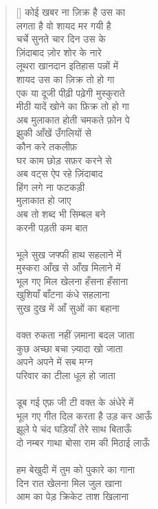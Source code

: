 \begin{verse}[\versewidth]\texthindi{
कोई खबर ना ज़िक्र है उस का\\
लगता है वो शायद मर गयी है\\
चर्चे सुनते चार दिन उस के\\
ज़िंदाबाद ज़ोर शोर के नारे\\
लूथरा खानदान इतिहास पन्नों में\\
शायद उस का ज़िक्र तो हो गा\\
एक या दूजी पीढ़ी पढ़ेगी मुस्कुराते\\
मीठी यादें खोने का फ़िक्र तो हो गा\\
अब मुलाकात होती चमकते फ़ोन पे\\
झुकी आँखें उँगलियों से\\
कौन करे तकलीफ़\\
घर काम छोड़ सफ़र करने से\\
अब वट्स ऐप रहे ज़िंदाबाद\\
हिंग लगे ना फटकड़ी\\
मुलाकात हो जाए\\
अब तो शब्द भी सिम्बल बने \\
करनी पड़ती कम बात \\
\\
भूले सुख जफ्फी हाथ सहलाने में\\
मुस्करा आँख से आँख मिलाने में\\
भूल गए मिल खेलना हँसना हँसाना\\
खुशियाँ बाँटना कंधे सहलाना\\
सुख दुख में आँ सुओं का बहाना\\
 \\
वक्त रुकता नहीं ज़माना बदल जाता \\
कुछ अच्छा बचा ज़्यादा खो जाता\\
अपने अपने में सब मग्न\\
परिवार का टीला धूल हो जाता\\
\\
डूब गई एफ़ जी टी वक्त के अंधेरे में\\
भूल गए गीत दिल करता है उड़ कर आऊँ\\
झूले पे चंद घड़ियाँ तेरे साथ बिताऊँ\\
दो नम्बर गाथा बोसा राम की मिठाई लाऊँ\\
\\
हम बेखुदी में तुम को पुकारे का गाना\\
दिन रात खेलना मिल जुल खाना\\
आम का पेड़ क्रिकेट ताश खिलाना\\
}
\end{verse}

